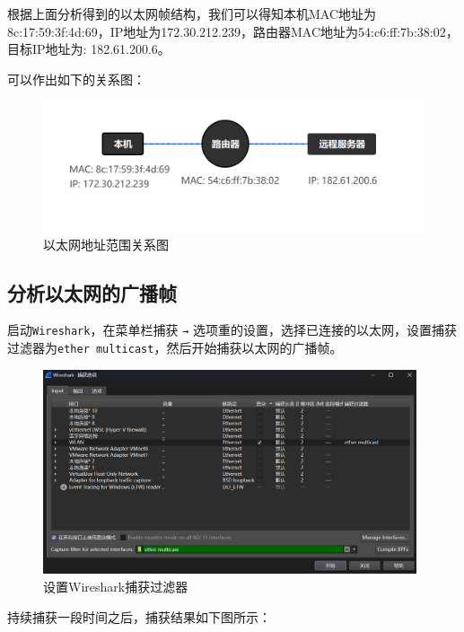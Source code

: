 \documentclass{article}
\begin{document}
	根据上面分析得到的以太网帧结构，我们可以得知本机MAC地址为8c:17:59:3f:4d:69，IP地址为172.30.212.239，路由器MAC地址为54:c6:ff:7b:38:02，目标IP地址为: 182.61.200.6。
	
	可以作出如下的关系图：
	
	\begin{figure}[H]
		\centering
		\includegraphics[width=15cm]{images/13.以太网地址范围关系图.png}
		\caption{以太网地址范围关系图}
	\end{figure}
	
	\subsection{分析以太网的广播帧}
	
	启动\texttt{Wireshark}，在菜单栏捕获 \texttt{→} 选项重的设置，选择已连接的以太网，设置捕获过滤器为\texttt{ether multicast}，然后开始捕获以太网的广播帧。
	
	\begin{figure}[H]
		\centering
		\includegraphics[width=11cm]{images/14.设置Wireshark捕获过滤器.png}
		\caption{设置Wireshark捕获过滤器}
	\end{figure}
	
	持续捕获一段时间之后，捕获结果如下图所示：
	
\end{document}
